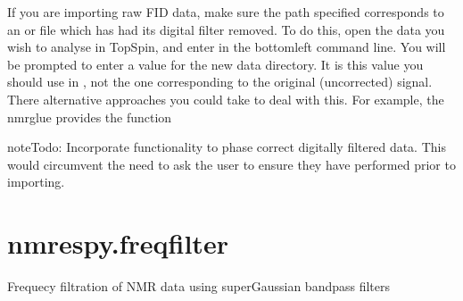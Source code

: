 \documentclass[letterpaper,10pt,english]{sphinxmanual}
\begin{document}
\begin{fulllineitems}
\begin{itemize}
\begin{itemize}
\begin{itemize}
\end{itemize}

\end{itemize}

\end{itemize}

\sphinxAtStartPar
{}

\sphinxAtStartPar
If you are importing raw FID data, make sure the path
specified corresponds to an  or  file which has had its
digital filter removed. To do this, open the data you wish to analyse in
TopSpin, and enter  in the bottom\sphinxhyphen{}left command line. You will be
prompted to enter a value for the new data directory. It is this value you
should use in , not the one corresponding to the original
(uncorrected) signal. There alternative approaches you could take to
deal with this. For example, the nmrglue provides the function

\sphinxAtStartPar
{}

\begin{sphinxadmonition}{note}{\label{\detokenize{references/load:id1}}Todo:}
\sphinxAtStartPar
Incorporate functionality to phase correct digitally filtered data.
This would circumvent the need to ask the user to ensure they have
performed  prior to importing.
\end{sphinxadmonition}

\end{fulllineitems}





\section{nmrespy.freqfilter}
\label{\detokenize{references/freqfilter:module-nmrespy.freqfilter}}\label{\detokenize{references/freqfilter:nmrespy-freqfilter}}\label{\detokenize{references/freqfilter::doc}}
\sphinxAtStartPar
Frequecy filtration of NMR data using super\sphinxhyphen{}Gaussian band\sphinxhyphen{}pass filters
\end{document}
